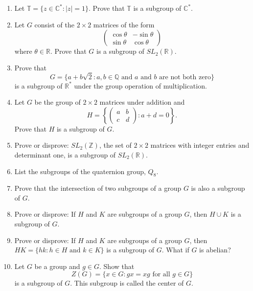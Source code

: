{\begin{enumerate}
 
\item
Let ${\mathbb T} = \{ z \in  {\mathbb C}^* : |z| =1 \}$. Prove that ${\mathbb
T}$ is a subgroup of ${\mathbb C}^*$. 
 
 
\item
Let $G$ consist of the $2 \times 2$ matrices of the form
\[
\begin{pmatrix}
\cos \theta & -\sin \theta \\
\sin \theta & \cos \theta
\end{pmatrix}
\]
where $\theta \in {\mathbb R}$. Prove that $G$ is a subgroup of $SL_2(
{\mathbb R})$. 
 
 
\item
Prove that
\[
G =
\{ a + b \sqrt{2} : \mbox{$a, b \in {\mathbb
Q}$ and $a$ and $b$ are not both zero}  \}
\]
is a subgroup of ${\mathbb R}^{\ast}$ under the group operation of
multiplication. 
 
 
\item
Let $G$ be the group of $2 \times 2$ matrices under addition and
\[
H
=
\left\{
\begin{pmatrix}
a & b \\
c & d
\end{pmatrix}
:
a + d = 0
\right\}.
\]
Prove that $H$ is a subgroup of $G$.
 
 
\item
Prove or disprove: $SL_2( {\mathbb Z} )$, the set of $2 \times 2$
matrices with integer entries and determinant one, is a subgroup of
$SL_2( {\mathbb R} )$. 
 
 
\item
List the subgroups of the quaternion group, $Q_8$.
 
 
\item
Prove that the intersection of two subgroups of a group $G$ is also a
subgroup of $G$. 
 
 
\item
Prove or disprove:  If $H$ and $K$ are subgroups of a group $G$, then
$H \cup K$ is a subgroup of $G$. 
 
 
\item
Prove or disprove: If $H$ and $K$ are subgroups of a group $G$, then
$H K = \{hk : h \in H \text{ and } k \in K \}$ is a subgroup of $G$.
What if $G$ is abelian? 
 
 
\item
Let $G$ be a group and $g \in G$. Show that
\[
Z(G) = \{ x \in G : gx = xg \mbox{ for all $g \in G$}
\}\label{centerofagroup} 
\]
is a subgroup of $G$. This subgroup is called the {\bfi
center\/} of $G$. 
 

\end{enumerate}}
